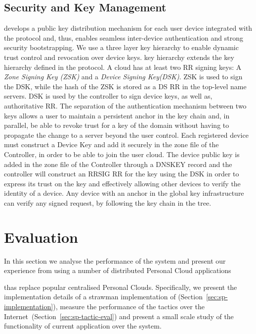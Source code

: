 \subsection{Security and Key Management} \label{signpost-security}

\signpost develops a public key distribution mechanism for each user device
integrated with the \dnssec protocol and, thus, enables seamless inter-device
authentication and strong security bootstrapping.  We use a three layer key
hierarchy to enable dynamic trust control and revocation over device keys.
\signpost key hierarchy extends the key hierarchy defined in the \dnssec
protocol. A \signpost cloud has at least two RR signing keys: A {\it Zone
  Signing Key (ZSK)} and a {\it Device Signing Key(DSK)}. ZSK is used to sign
the DSK, while the hash of the ZSK is stored as a DS RR in the top-level name
servers. DSK is used by the controller to sign device keys, as well as,
authoritative RR. The separation of the authentication mechanism between two
keys allows a user to maintain a persistent anchor in the \dnssec key chain and,
in parallel, be able to revoke trust for a key of the domain without having to
propagate the change to a server beyond the user control.  Each registered
\signpost device must construct a Device Key and add it securely in the zone
file of the Controller, in order to be able to join the user cloud. The device
public key is added in the zone file of the Controller through a DNSKEY record
and the controller will construct an RRSIG RR for the key using the DSK in order
to express its trust on the key and effectively allowing other devices to
verify the identity of a device. Any device with an anchor in the global \dnssec
key infrastructure can verify any \signpost signed request, by following the
key chain in the \dnssec tree.

\section{Evaluation}\label{sec:signpost-evaluation}

In this section we analyse the performance of the \signpost system and present
our experience from using a number of distributed Personal Cloud applications

thas replace popular centralised Personal Clouds. Specifically, we present the
implementation details of a strawman implementation of \signpost
(Section~\ref{sec:sp-implementation}), measure the performance of the \signpost
tactics over the Internet~(Section~\ref{sec:sp-tactic-eval}) and present a small
scale study of the functionality of current application over the \signpost
system. 

